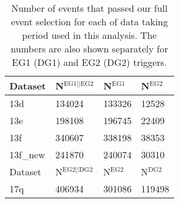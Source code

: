 \begin{table}[h]
   \centering
   \caption{Number of events that passed our full event selection for each of data taking period used in this analysis. The numbers are also shown separately for EG1 (DG1) and EG2 (DG2) triggers.}
   \label{tab:eventsselected}
   \begin{tabular*}{1.0\columnwidth}{@{\extracolsep{\fill}}llll@{}}
    \hline
    Dataset &  	N$^{\mathrm{EG1||EG2}}$ &	N$^{\mathrm{EG1}}$ & N$^{\mathrm{EG2}}$\\
    \hline
    13d &	134024 & 133326 & 12528\\
    13e &	198108 & 196745 & 22409\\
    13f &   340607 & 338198 & 38353\\
    13f\_new & 241870 & 240074 & 30310\\
    \hline
    Dataset &	N$^{\mathrm{EG2 || DG2}}$ &		N$^{\mathrm{EG2}}$ & N$^{\mathrm{DG2}}$\\
    \hline

    17q & 406934 & 301086 & 119498 \\
 
    \hline
   \end{tabular*}
\end{table}

